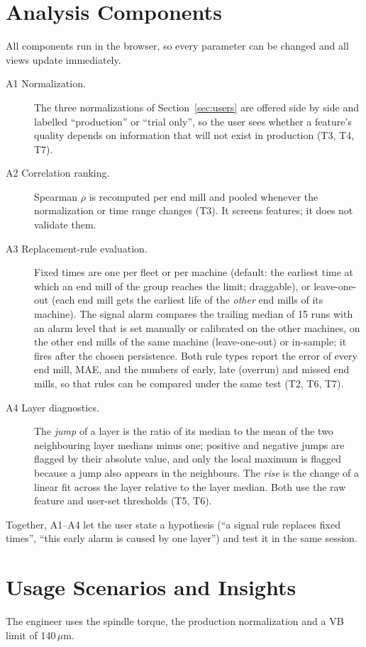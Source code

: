 \section{Analysis Components}
All components run in the browser, so every parameter can be changed and all views update immediately.
\begin{description}
\item[A1 Normalization.] The three normalizations of Section~\ref{sec:users} are offered side by side and
labelled ``production'' or ``trial only'', so the user sees whether a feature's quality depends on information
that will not exist in production (T3, T4, T7).
\item[A2 Correlation ranking.] Spearman $\rho$ is recomputed per end mill and pooled whenever the
normalization or time range changes (T3). It screens features; it does not validate them.
\item[A3 Replacement-rule evaluation.] Fixed times are one per fleet or per machine (default: the earliest
time at which an end mill of the group reaches the limit; draggable), or leave-one-out (each end mill gets the
earliest life of the \emph{other} end mills of its machine). The signal alarm compares the trailing median of
15 runs with an alarm level that is set manually or calibrated on the other machines, on the other end mills of
the same machine (leave-one-out) or in-sample; it fires after the chosen persistence. Both rule types report
the error of every end mill, MAE, and the numbers of early, late (overrun) and missed end mills, so that rules can
be compared under the same test (T2, T6, T7).
\item[A4 Layer diagnostics.] The \emph{jump} of a layer is the ratio of its median to the mean of the two
neighbouring layer medians minus one; positive and negative jumps are flagged by their absolute value, and
only the local maximum is flagged because a jump also appears in the neighbours. The \emph{rise} is the change
of a linear fit across the layer relative to the layer median. Both use the raw feature and user-set
thresholds (T5, T6).
\end{description}
Together, A1--A4 let the user state a hypothesis (``a signal rule replaces fixed times'', ``this early alarm is
caused by one layer'') and test it in the same session.

\section{Usage Scenarios and Insights}
The engineer uses the spindle torque, the production normalization and a VB limit of 140\,$\mu$m.

